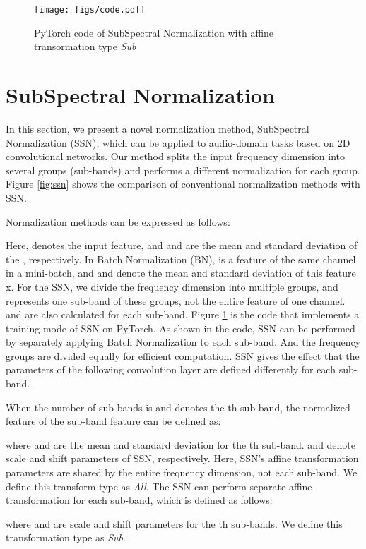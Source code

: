 \documentclass{article}
\begin{document}
\begin{figure}[t]
\centering
\texttt{[image: figs/code.pdf]}
\vskip -0.07in
\caption{PyTorch code of SubSpectral Normalization with affine transormation type \textit{Sub}} 
\label{fig:code}
\end{figure}

\section{SubSpectral Normalization}
\label{sec:method}
In this section, we present a novel normalization method, SubSpectral Normalization (SSN), which can be applied to audio-domain tasks based on 2D convolutional networks. Our method splits the input frequency dimension into several groups (sub-bands) and performs a different normalization for each group. Figure \ref{fig:ssn} shows the comparison of conventional normalization methods with SSN.

Normalization methods can be expressed as follows:


\noindent Here,  denotes the input feature, and  and  are the mean and standard deviation of the , respectively.
In Batch Normalization (BN),  is a feature of the same channel in a mini-batch, and  and  denote the mean and standard deviation of this feature x. 
For the SSN, we divide the frequency dimension into multiple groups, and  represents one sub-band of these groups, not the entire feature of one channel.  and  are also calculated for each sub-band.
Figure \ref{fig:code} is the code that implements a training mode of SSN on PyTorch.  As shown in the code, SSN can be performed by separately applying Batch Normalization to each sub-band. And the frequency groups are divided equally for efficient computation. SSN gives the effect that the parameters of the following convolution layer are defined differently for each sub-band.

When the number of sub-bands is  and  denotes the th sub-band, 
the normalized feature  of the sub-band feature  can be defined as:

where  and  are the mean and standard deviation for the th sub-band.  and  denote scale and shift parameters of SSN, respectively. Here, SSN's affine transformation parameters are shared by the entire frequency dimension, not each sub-band. We define this transform type as \textit{All}. The SSN can perform separate affine transformation for each sub-band, which is defined as follows:


where  and  are scale and shift parameters for the th sub-bands. We define this transformation type as \textit{Sub}.
\end{document}
